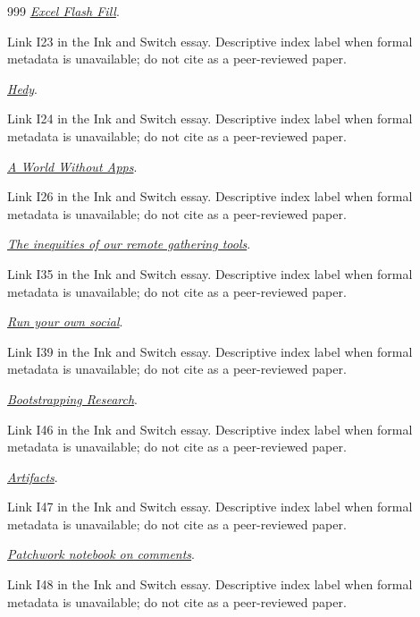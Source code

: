 \documentclass[11pt,letterpaper]{article}
\begin{document}
\begin{thebibliography}{999}
\href{https://support.microsoft.com/en-us/office/using-flash-fill-in-excel-3f9bcf1e-db93-4890-94a0-1578341f73f7}{\emph{Excel Flash Fill}}.
\par {\small Link I23 in the Ink and Switch essay. Descriptive index label when formal metadata is unavailable; do not cite as a peer-reviewed paper.}

\href{https://hedy.org/}{\emph{Hedy}}.
\par {\small Link I24 in the Ink and Switch essay. Descriptive index label when formal metadata is unavailable; do not cite as a peer-reviewed paper.}

\href{https://www.youtube.com/watch?v=ntaudUum06E}{\emph{A World Without Apps}}.
\par {\small Link I26 in the Ink and Switch essay. Descriptive index label when formal metadata is unavailable; do not cite as a peer-reviewed paper.}

\href{https://medium.com/@paulate/the-inequities-of-our-remote-gathering-tools-185f0446b0f6}{\emph{The inequities of our remote gathering tools}}.
\par {\small Link I35 in the Ink and Switch essay. Descriptive index label when formal metadata is unavailable; do not cite as a peer-reviewed paper.}

\href{https://runyourown.social/}{\emph{Run your own social}}.
\par {\small Link I39 in the Ink and Switch essay. Descriptive index label when formal metadata is unavailable; do not cite as a peer-reviewed paper.}

\href{https://dynamicland.org/2019/Bootstrapping_Research/}{\emph{Bootstrapping Research}}.
\par {\small Link I46 in the Ink and Switch essay. Descriptive index label when formal metadata is unavailable; do not cite as a peer-reviewed paper.}

\href{https://support.anthropic.com/en/articles/9487310-what-are-artifacts-and-how-do-i-use-them}{\emph{Artifacts}}.
\par {\small Link I47 in the Ink and Switch essay. Descriptive index label when formal metadata is unavailable; do not cite as a peer-reviewed paper.}

\href{https://www.inkandswitch.com/patchwork/notebook/11/}{\emph{Patchwork notebook on comments}}.
\par {\small Link I48 in the Ink and Switch essay. Descriptive index label when formal metadata is unavailable; do not cite as a peer-reviewed paper.}


\end{thebibliography}
\end{document}
